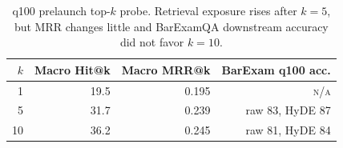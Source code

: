 \begin{table}[!htbp]
\centering
\caption{q100 prelaunch top-$k$ probe. Retrieval exposure rises after $k=5$, but MRR changes little and BarExamQA downstream accuracy did not favor $k=10$.}
\label{tab:q100_topk_probe}
\scriptsize
\setlength{\tabcolsep}{4pt}
\begin{tabular}{rrrr}
\toprule
$k$ & Macro Hit@k & Macro MRR@k & BarExam q100 acc. \\
\midrule
1 & 19.5 & 0.195 & \textsc{n/a} \\
5 & 31.7 & 0.239 & raw 83, HyDE 87 \\
10 & 36.2 & 0.245 & raw 81, HyDE 84 \\
\bottomrule
\end{tabular}
\end{table}
